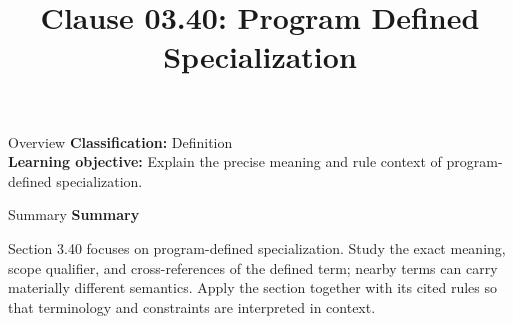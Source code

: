 \documentclass[10pt,letterpaper]{article}
\title{Clause 03.40: Program Defined Specialization}
\author{}
\date{}
\begin{document}
\maketitle
\begin{CornellOverviewBox}{Overview}
\textbf{Classification:} Definition\\[2pt]
\textbf{Learning objective:} Explain the precise meaning and rule context of program-defined specialization.
\end{CornellOverviewBox}\begin{CornellSummaryBox}{Summary}
{\sffamily\bfseries\color{Accent} Summary}\par\vspace{3pt}Section 3.40 focuses on program-defined specialization. Study the exact meaning, scope qualifier, and cross-references of the defined term; nearby terms can carry materially different semantics. Apply the section together with its cited rules so that terminology and constraints are interpreted in context.
\end{CornellSummaryBox}
\end{document}
